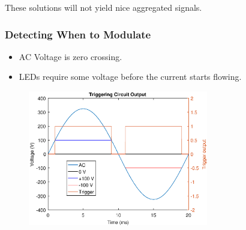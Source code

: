 \documentclass{beamer}
\begin{document}
\begin{frame}
		These solutions will not yield nice aggregated signals.
		
	\end{frame}




	\begin{frame}\frametitle{Detecting When to Modulate}

		\begin{itemize}

			\item AC Voltage is zero crossing.

			\item LEDs require some voltage before the current starts flowing.

		\end{itemize}
		

		\begin{figure}
			\centering
			\includegraphics[width=0.7\textwidth]{ac-wave-triggering.eps}
		\end{figure}
		
		
	\end{frame}
\end{document}
